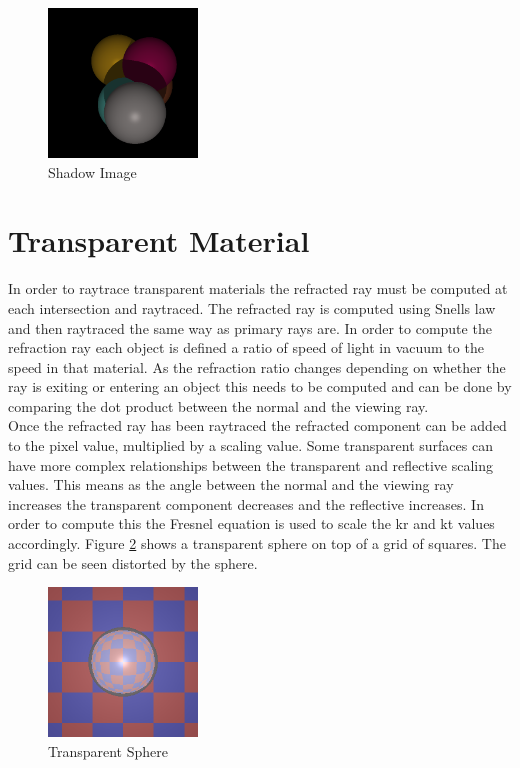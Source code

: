 \documentclass{article}
\begin{document}
\begin{figure}[H]
  \begin{center}
  \includegraphics[width=150px]{Images/shadows.png}
  \caption{Shadow Image}
  \label{fig:shadow}
  \end{center}
\end{figure}

\section{Transparent Material}

In order to raytrace transparent materials the refracted ray must be computed at
each intersection and raytraced. The refracted ray is computed using Snells law
and then raytraced the same way as primary rays are. In order to compute the refraction
ray each object is defined a ratio of speed of light in vacuum to the speed in that
material. As the refraction ratio changes depending on whether the ray is exiting
or entering an object this needs to be computed and can be done by comparing
the dot product between the normal and the viewing ray.\\

Once the refracted ray has been raytraced the refracted component can be added
to the pixel value, multiplied by a scaling value. Some transparent surfaces
can have more complex relationships between the transparent and reflective
scaling values. This means as the angle between the normal and the viewing ray increases
the transparent component decreases and the reflective increases. In order to
compute this the Fresnel equation is used to scale the kr and kt values accordingly.
Figure \ref{fig:trans} shows a transparent sphere on top of a grid of squares.
The grid can be seen distorted by the sphere.
\begin{figure}[H]
  \begin{center}
  \includegraphics[width=150px]{Images/transparent.png}
  \caption{Transparent Sphere}
  \label{fig:trans}
  \end{center}
\end{figure}
\newpage
\end{document}

